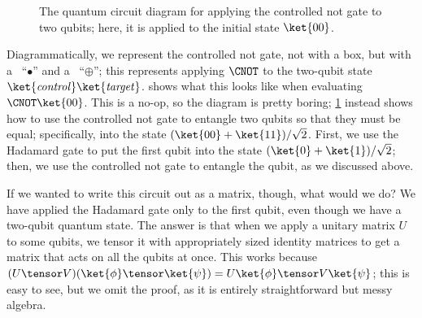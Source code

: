 \begin{figure}
  \centerline{}
  \caption{The quantum circuit diagram for applying the controlled not gate to
    two qubits; here, it is applied to the initial state $\ket{00}$.}
  \label{qcd:entangle-2-equal}
\end{figure}

Diagrammatically, we represent the controlled not gate, not with a box, but with
a ~``$\bullet$'' and a ~``$\oplus$''; this represents
applying $\CNOT$ to the two-qubit state
$\ket{\mathit{control}}\ket{\mathit{target}}$.   shows what
this looks like when evaluating $\CNOT\ket{00}$.  This is a no-op, so the
diagram is pretty boring; \cref{qcd:entangle-2-equal} instead shows how to use
the controlled not gate to entangle two qubits so that they must be equal;
specifically, into the state $(\ket{00} + \ket{11})/\sqrt{2}$.  First, we use
the Hadamard gate to put the first qubit into the state $(\ket{0} +
\ket{1})/\sqrt{2}$; then, we use the controlled not gate to entangle the qubit,
as we discussed above.

If we wanted to write this circuit out as a matrix, though, what would we do?
We have applied the Hadamard gate only to the first qubit, even though we have a
two-qubit quantum state.  The answer is that when we apply a unitary matrix $U$
to some qubits, we tensor it with appropriately sized identity matrices to get a
matrix that acts on all the qubits at once.  This works because $(U \tensor
V)(\ket{\phi} \tensor \ket{\psi}) = U\ket{\phi} \tensor V\ket{\psi}$; this is
easy to see, but we omit the proof, as it is entirely straightforward but messy
algebra.

